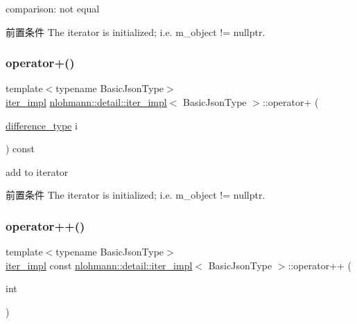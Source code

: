 comparison\+: not equal 

\begin{DoxyPrecond}{前置条件}
The iterator is initialized; i.\+e. {\ttfamily m\+\_\+object != nullptr}. 
\end{DoxyPrecond}
\mbox{\label{classnlohmann_1_1detail_1_1iter__impl_a8ef76aeb5a5032768f0f61f48ac189c0}} 
\subsubsection{\texorpdfstring{operator+()}{operator+()}}
{\footnotesize\ttfamily template$<$typename Basic\+Json\+Type$>$ \\
\mbox{\hyperlink{classnlohmann_1_1detail_1_1iter__impl}{iter\+\_\+impl}} \mbox{\hyperlink{classnlohmann_1_1detail_1_1iter__impl}{nlohmann\+::detail\+::iter\+\_\+impl}}$<$ Basic\+Json\+Type $>$\+::operator+ (\begin{DoxyParamCaption}\item[{\mbox{\hyperlink{classnlohmann_1_1detail_1_1iter__impl_a2f7ea9f7022850809c60fc3263775840}{difference\+\_\+type}}}]{i }\end{DoxyParamCaption}) const\hspace{0.3cm}{\ttfamily [inline]}}



add to iterator 

\begin{DoxyPrecond}{前置条件}
The iterator is initialized; i.\+e. {\ttfamily m\+\_\+object != nullptr}. 
\end{DoxyPrecond}
\mbox{\label{classnlohmann_1_1detail_1_1iter__impl_a7d2397773b2dce42f30f0375a6a1d850}} 
\subsubsection{\texorpdfstring{operator++()}{operator++()}\hspace{0.1cm}{\footnotesize\ttfamily [1/2]}}
{\footnotesize\ttfamily template$<$typename Basic\+Json\+Type$>$ \\
\mbox{\hyperlink{classnlohmann_1_1detail_1_1iter__impl}{iter\+\_\+impl}} const \mbox{\hyperlink{classnlohmann_1_1detail_1_1iter__impl}{nlohmann\+::detail\+::iter\+\_\+impl}}$<$ Basic\+Json\+Type $>$\+::operator++ (\begin{DoxyParamCaption}\item[{int}]{ }\end{DoxyParamCaption})\hspace{0.3cm}{\ttfamily [inline]}}



